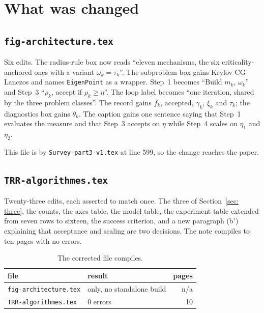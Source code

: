 \documentclass[11pt,a4paper]{article}
\begin{document}
\section{What was changed}\label{sec: changed}

\subsection{\texttt{fig-architecture.tex}}

Six edits. The radius-rule box now reads ``eleven mechanisms, the six
criticality-anchored ones with a variant $\omega_k = \tau_k$''. The subproblem
box gains Krylov CG-Lanczos and names \texttt{EigenPoint} as a wrapper. Step~1
becomes ``Build $m_k$, $\omega_k$'' and Step~3 ``$\rho_k$, accept if
$\rho_k \ge \eta$''. The loop label becomes ``one iteration, shared by the three
problem classes''. The record gains $f_k$, accepted, $\gamma_k$, $\xi_k$ and
$\tau_k$; the diagnostics box gains $\theta_k$. The caption gains one sentence
saying that Step~1 evaluates the measure and that Step~3 accepts on $\eta$ while
Step~4 scales on $\eta_1$ and $\eta_2$.

This file is \verb|| by \texttt{Survey-part3-v1.tex} at line 599, so the
change reaches the paper.

\subsection{\texttt{TRR-algorithmes.tex}}

Twenty-three edits, each asserted to match once. The three of
Section~\ref{sec: three}, the counts, the axes table, the model table, the
experiment table extended from seven rows to sixteen, the success criterion, and
a new paragraph (b$'$) explaining that acceptance and scaling are two decisions.
The note compiles to ten pages with no errors.

\begin{table}[H]
  \centering\small
  \caption{The corrected file compiles.}
  \label{tab: builds}
  \begin{tabular}{llr}
    \toprule
    file & result & pages \\
    \midrule
    \texttt{fig-architecture.tex} & \verb|| only, no standalone build & n/a \\
    \texttt{TRR-algorithmes.tex}  & 0 errors & 10 \\
    \bottomrule
  \end{tabular}
\end{table}
\end{document}
